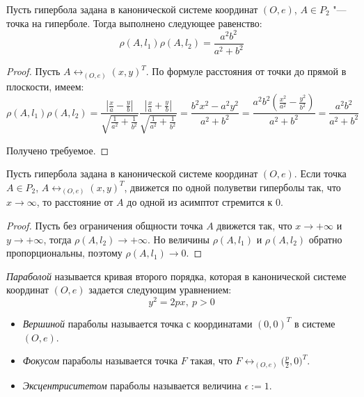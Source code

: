 {	\begin{proposition}
		Пусть гипербола задана в канонической системе координат $(O, e)$, $A \in P_2$ "--- точка на гиперболе. Тогда выполнено следующее равенство:
		\[\rho(A, l_1)\rho(A, l_2) = \frac{a^2b^2}{a^2 + b^2}\]
	\end{proposition}
	
	\begin{proof}
		Пусть $A \leftrightarrow_{(O, e)} (x, y)^T$. По формуле расстояния от точки до прямой в плоскости, имеем:
		\[\rho(A, l_1)\rho(A, l_2) = \frac{\left|\frac{x}{a}-\frac{y}{b}\right|}{\sqrt{\frac{1}{a^2} + \frac{1}{b^2}}} 
		\frac{\left|\frac{x}{a}+\frac{y}{b}\right|}{\sqrt{\frac{1}{a^2} + \frac{1}{b^2}}}
		= \frac{b^2x^2 - a^2y^2}{a^2 + b^2} = \frac{a^2b^2\left(\frac{x^2}{a^2} - \frac{y^2}{b^2}\right)}{a^2 + b^2} = \frac{a^2b^2}{a^2 + b^2}\]
		
		Получено требуемое.
	\end{proof}
	
	\begin{corollary}
		Пусть гипербола задана в канонической системе координат $(O, e)$. Если точка $A \in P_2$, $A \leftrightarrow_{(O, e)} (x, y)^T$, движется по одной полуветви гиперболы так, что $x \rightarrow \infty$, то расстояние от $A$ до одной из асимптот стремится к $0$.
	\end{corollary}
	
	\begin{proof}
		Пусть без ограничения общности точка $A$ движется так, что $x \rightarrow +\infty$ и $y \rightarrow +\infty$, тогда $\rho(A, l_2) \rightarrow +\infty$. Но величины $\rho(A, l_1)$ и $\rho(A, l_2)$ обратно пропорциональны, поэтому $\rho(A, l_1) \rightarrow 0$.
	\end{proof}
	
	\begin{definition}
		\textit{Параболой} называется кривая второго порядка, которая в канонической системе координат $(O, e)$ задается следующим уравнением:
		\[y^2 = 2px,~p > 0\]
		
		\begin{itemize}
			\item \textit{Вершиной} параболы называется точка с координатами $(0, 0)^T$ в системе $(O, e)$.
			
			\item \textit{Фокусом} параболы называется точка $F$ такая, что $F \leftrightarrow_{(O, e)} \big(\frac p2, 0\big)^T$.
			
			\item \textit{Эксцентриситетом} параболы называется величина $\epsilon := 1$.
			

\end{itemize}
\end{definition}}
